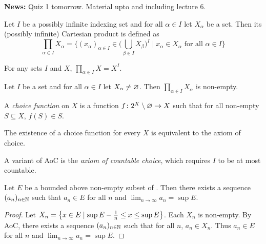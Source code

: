 
\textbf{News:} Quiz 1 tomorrow.
Material upto and including lecture 6.

\begin{definition*}
    Let $I$ be a possibly infinite indexing set and for all $\alpha \in I$
    let $X_\alpha$ be a set.
    Then its (possibly infinite) Cartesian product is defined as
    \[
        \prod_{\alpha \in I} X_\alpha = \bigg\{
            (x_\alpha)_{\alpha \in I} \in \Big(\bigcup_{\beta \in I}
            X_\beta\Big)^I \;\bigg\vert\; x_\alpha \in X_\alpha
            \text{ for all } \alpha \in I
        \bigg\}
    \]
\end{definition*}

\begin{exercise}
    For any sets $I$ and $X$, $\prod_{\alpha \in I} X = X^I$.
\end{exercise}
\begin{axiom}[Choice] \label{def:zfc:choice}
    Let $I$ be a set and for all $\alpha \in I$ let $X_\alpha \ne \varnothing$.
    Then $\prod_{\alpha \in I} X_\alpha$ is non-empty.
\end{axiom}

\begin{definition*}
    A \emph{choice function} on $X$ is a function $f\colon 2^X \setminus \varnothing
    \to X$ such that for all non-empty $S \subseteq X$, $f(S) \in S$.
\end{definition*}
\begin{fact}
    The existence of a choice function for every $X$ is equivalent to the
    axiom of choice.
\end{fact}
\begin{remark}
    A variant of AoC is the \emph{axiom of countable choice}, which requires
    $I$ to be at most countable.
\end{remark}

\begin{lemma}
    Let $E$ be a bounded above non-empty subset of \R.
    Then there exists a sequence $(a_n)_{n \in \mathbb{N}}$ such that $a_n \in E$ for
    all $n$ and $\lim_{n \to \infty} a_n = \sup E$.
\end{lemma}
\begin{proof}
    Let $X_n = \set{x \in E \mid \sup E - \frac1n \le x \le \sup E}$.
    Each $X_n$ is non-empty.
    By AoC, there exists a sequence $(a_n)_{n \in \mathbb{N}}$ such that for all
    $n$, $a_n \in X_n$.
    Thus $a_n \in E$ for all $n$ and $\lim_{n \to \infty} a_n = \sup E$.
\end{proof}

